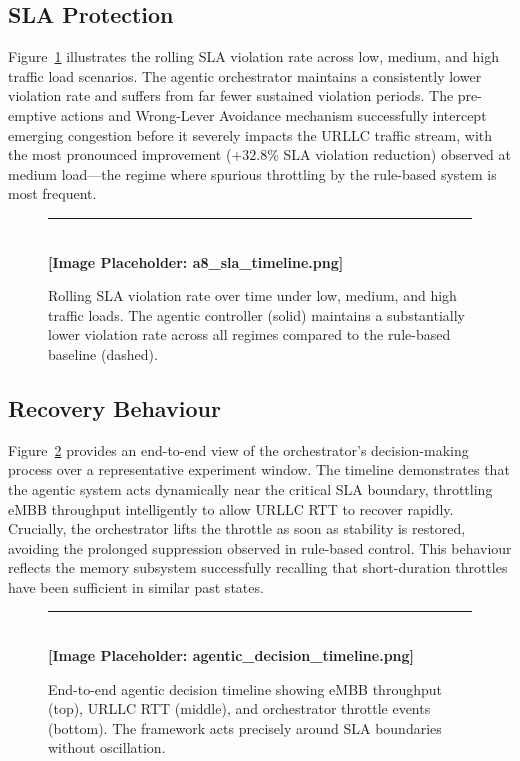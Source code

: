 \documentclass[12pt]{article}
\begin{document}
\subsection{SLA Protection}

Figure~\ref{fig:sla_timeline} illustrates the rolling SLA violation rate
across low, medium, and high traffic load scenarios. The agentic
orchestrator maintains a consistently lower violation rate and suffers
from far fewer sustained violation periods. The pre-emptive actions and
Wrong-Lever Avoidance mechanism successfully intercept emerging congestion
before it severely impacts the URLLC traffic stream, with the most
pronounced improvement ($+32.8\%$ SLA violation reduction) observed at
medium load---the regime where spurious throttling by the rule-based
system is most frequent.

\begin{figure}[H]
\centering
\rule{\textwidth}{6cm} \\ \vspace{0.5em}\centering\textbf{[Image Placeholder: a8\_sla\_timeline.png]}
\caption{Rolling SLA violation rate over time under low, medium, and
high traffic loads. The agentic controller (solid) maintains a
substantially lower violation rate across all regimes compared to the
rule-based baseline (dashed).}
\label{fig:sla_timeline}
\end{figure}

\subsection{Recovery Behaviour}

Figure~\ref{fig:decision_timeline} provides an end-to-end view of the
orchestrator's decision-making process over a representative experiment
window. The timeline demonstrates that the agentic system acts
dynamically near the critical SLA boundary, throttling eMBB throughput
intelligently to allow URLLC RTT to recover rapidly. Crucially, the
orchestrator lifts the throttle as soon as stability is restored,
avoiding the prolonged suppression observed in rule-based control. This
behaviour reflects the memory subsystem successfully recalling that
short-duration throttles have been sufficient in similar past states.

\begin{figure}[H]
\centering
\rule{\textwidth}{6cm} \\ \vspace{0.5em}\centering\textbf{[Image Placeholder: agentic\_decision\_timeline.png]}
\caption{End-to-end agentic decision timeline showing eMBB throughput
(top), URLLC RTT (middle), and orchestrator throttle events (bottom).
The framework acts precisely around SLA boundaries without oscillation.}
\label{fig:decision_timeline}
\end{figure}
\end{document}

